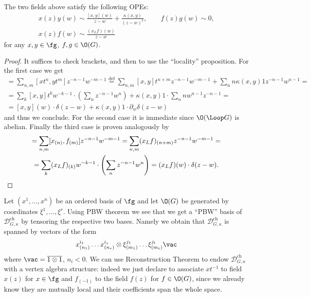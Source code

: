 \documentclass[a4paper, 10pt]{article}
\newcommand{\Dc}{ \mathcal{D}^{\mathrm{ch}}_{G, \kappa} }         %
\begin{document}
            \begin{prop}
                \label{prop:opes}
                The two fields above satisfy the following OPEs:
                \begin{gather*}
                    x(z)y(w) \sim \frac{[x, y](w)}{z - w} + \frac{\kappa(x, y)}{(z-w)^2}, \qquad f(z)g(w) \sim 0,\\
                    x(z)f(w) \sim \frac{(x_Lf)(w)}{z - w}
                \end{gather*}
                for any $x, y \in \fg$, $f, g \in \O(G)$.
            \end{prop} 
            \begin{proof}
                It suffices to check brackets, and then to use the ``locality'' proposition. For the first case we get 
                \begin{gather*}
                    [x(z), y(w)] = \sum_{n, m} [xt^n, yt^m]z^{-n-1}w^{-m-1} \stackrel{\textrm{def}}{=} \sum_{n, m}[x,y]t^{n+m}z^{-n-1}w^{-m-1} + \sum_n n\kappa(x, y)1z^{-n-1}w^{n-1}= \\
                    = \sum_k [x, y]t^k w^{-k-1}\cdot \left(\sum_n z^{-n-1}w^{n} \right) + \kappa(x, y)1 \cdot \sum_n nw^{n-1}z^{-n-1} = \\ = [x, y](w) \cdot \delta(z - w) + \kappa(x, y)1\cdot \partial_w\delta(z - w)
                \end{gather*}
                and thus we conclude. For the second case it is immediate since $\O(\Loop G)$ is abelian. Finally the third case is proven analogously by 
                \begin{gather*}
                    [x(z), f(w)] = \sum_{n, m}[x_{(n)}, f_{(m)}]z^{-n-1}w^{-m-1} = \sum_{n, m}(x_Lf)_{(n+m)}z^{-n-1}w^{-m-1} = \\ = \sum_k (x_Lf)_{(k)}w^{-k-1} \cdot \left(\sum_n z^{-n-1}w^n \right) = (x_Lf)(w) \cdot \delta(z - w). \qedhere
                \end{gather*}
            \end{proof}
            Let $(x^1, \dots, x^n)$ be an ordered basis of $\fg$ and let $\O(G)$ be generated by coordinates $\xi^1, \dots, \xi^r$. Using PBW theorem we see that we get a ``PBW'' basis of $\Dc$ by tensoring the respective two bases. Namely we obtain that $\Dc$ is spanned by vectors of the form \[x^{i_1}_{(n_1)}\dots x^{i_s}_{(n_r)} \otimes \xi^{j_1}_{(m_1)}\dots \xi^{j_t}_{(m_t)} \vac \] where $\vac = \overline{1 \otimes 1}$, $n_i < 0$.
            We can use Reconstruction Theorem to endow $\Dc$ with a vertex algebra structure: indeed we just declare to associate $xt^{-1}$ to field $x(z)$ for $x \in \fg$ and $f_{(-1)}$ to the field $f(z)$ for $f \in \O(G)$, since we already know they are mutually local and their coefficients span the whole space. 
\end{document}

